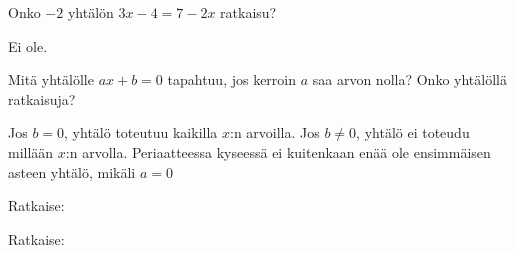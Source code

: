 \begin{tehtavasivu}

\begin{tehtava}
Onko $-2$ yhtälön $3x-4 = 7-2x$ ratkaisu?
\begin{vastaus}
Ei ole.
\end{vastaus}
\end{tehtava}

\begin{tehtava}
Mitä yhtälölle $ax+b = 0$ tapahtuu, jos kerroin $a$ saa arvon nolla?
Onko yhtälöllä ratkaisuja?
\begin{vastaus}
Jos $b = 0$, yhtälö toteutuu kaikilla $x$:n arvoilla. Jos $b \neq 0$, yhtälö
ei toteudu millään $x$:n arvolla. Periaatteessa kyseessä ei kuitenkaan
enää ole ensimmäisen asteen yhtälö, mikäli $a = 0$
\end{vastaus}
\end{tehtava}

\begin{tehtava}
%
Ratkaise:
\begin{alakohdat}
\end{alakohdat}
\begin{vastaus}
\begin{alakohdat}
\end{alakohdat}
\end{vastaus}
\end{tehtava}


\begin{tehtava}
Ratkaise:
\begin{alakohdat}
\end{alakohdat}
\begin{vastaus}
\begin{alakohdat}
\end{alakohdat}
\end{vastaus}
\end{tehtava}


\end{tehtavasivu}

